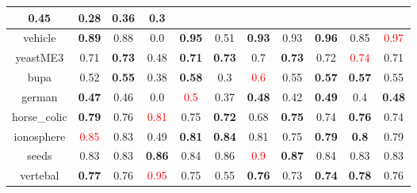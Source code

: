 \documentclass{article}%
\begin{document}
\begin{tabular}{c|cccccccccc}
{0.45
}&0.28&\textbf{0.36}&0.3\\%
\hline%
vehicle&\textbf{0.89}&0.88&0.0&\textbf{0.95}&0.51&\textbf{0.93}&0.93&\textbf{0.96}&0.85&\textcolor{red}{ 
0.97
}\\%
\hline%
yeastME3&0.71&\textbf{0.73}&0.48&\textbf{0.71}&\textbf{0.73}&0.7&\textbf{0.73}&0.72&\textcolor{red}{ 
0.74
}&0.71\\%
\hline%
bupa&0.52&\textbf{0.55}&0.38&\textbf{0.58}&0.3&\textcolor{red}{ 
0.6
}&0.55&\textbf{0.57}&\textbf{0.57}&0.55\\%
\hline%
german&\textbf{0.47}&0.46&0.0&\textcolor{red}{ 
0.5
}&0.37&\textbf{0.48}&0.42&\textbf{0.49}&0.4&\textbf{0.48}\\%
\hline%
horse\_colic&\textbf{0.79}&0.76&\textcolor{red}{ 
0.81
}&0.75&\textbf{0.72}&0.68&\textbf{0.75}&0.74&\textbf{0.76}&0.74\\%
\hline%
ionosphere&\textcolor{red}{ 
0.85
}&0.83&0.49&\textbf{0.81}&\textbf{0.84}&0.81&0.75&\textbf{0.79}&\textbf{0.8}&0.79\\%
\hline%
seeds&0.83&0.83&\textbf{0.86}&0.84&0.86&\textcolor{red}{ 
0.9
}&\textbf{0.87}&0.84&0.83&0.83\\%
\hline%
vertebal&\textbf{0.77}&0.76&\textcolor{red}{ 
0.95
}&0.75&0.55&\textbf{0.76}&0.73&\textbf{0.74}&\textbf{0.78}&0.76\\%
\hline%
\end{tabular}

%
\end{document}
